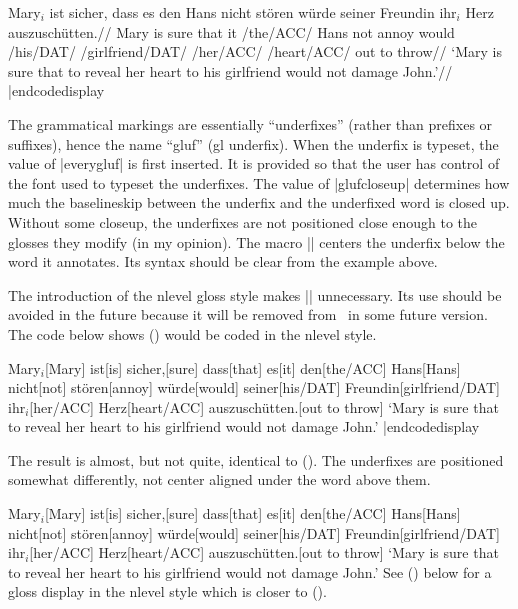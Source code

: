 \codedisplay
\ex[glufcloseup=.4ex,everygluf=\footnotesize]
\begingl
\gla Mary$_i$ ist sicher, dass es den Hans nicht st\"oren
   w\"urde seiner Freundin ihr$_i$ Herz auszusch\"utten.//
\glb Mary is sure that it \gluf/the/ACC/ Hans not annoy would
   \gluf/his/DAT/ \gluf/girlfriend/DAT/ \gluf/her/ACC/
   \gluf/heart/ACC/ {out to throw}//
\glft `Mary is sure that to reveal her heart to his girlfriend
would not damage John.'//
\endgl
\xe
|endcodedisplay

The grammatical markings are essentially ``underfixes'' (rather than
prefixes or suffixes), hence the name ``gluf'' (gl underfix). When the
underfix is typeset, the value of |everygluf| is first inserted.  It
is provided so that the user has control of the font used to typeset
the underfixes. The value of |glufcloseup| determines how much the
baselineskip between the underfix and the underfixed word is closed
up.  Without some closeup, the underfixes are not positioned close
enough to the glosses they modify (in my opinion). The macro |\gluf|
centers the underfix below the word it annotates.  Its syntax should
be clear from the example above.

The introduction of the nlevel gloss style makes |\gluf| unnecessary.
Its use should be avoided in the future because it will be removed
from \ExPex\ in some future version.  The code below shows (\lastx)
would be coded in the nlevel style.

\codedisplay
\ex[glstyle=nlevel,glneveryline={\it,,\footnotesize},
   glnabovelineskip={,,-.4ex},extraglskip=0pt]
\begingl
Mary$_i$[Mary]
ist[is]
sicher,[sure]
dass[that]
es[it]
den[the/ACC]
Hans[Hans]
nicht[not]
st\"oren[annoy]
w\"urde[would]
seiner[his/DAT]
Freundin[girlfriend/DAT]
ihr$_i$[her/ACC]
Herz[heart/ACC]
auszusch\"utten.[out to throw]
\glft `Mary is sure that to reveal her heart to his girlfriend
would not damage John.'
\endgl
\xe
|endcodedisplay

The result is almost, but not quite, identical to (\lastx).  The
underfixes are positioned somewhat differently, not center aligned
under the word above them.

\framedisplay
\ex[glstyle=nlevel,glneveryline={\it,,\footnotesize},
   glnabovelineskip={,,-.4ex},extraglskip=0pt]
\begingl
Mary$_i$[Mary]
ist[is]
sicher,[sure]
dass[that]
es[it]
den[the/ACC]
Hans[Hans]
nicht[not]
st\"oren[annoy]
w\"urde[would]
seiner[his/DAT]
Freundin[girlfriend/DAT]
ihr$_i$[her/ACC]
Herz[heart/ACC]
auszusch\"utten.[out to throw]
\glft `Mary is sure that to reveal her heart to his girlfriend
would not damage John.'
\endgl
\xe
\endframedisplay
See () below for a gloss display in the nlevel style
which is closer to (\blastx).

